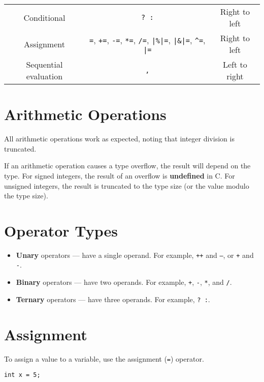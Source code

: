 \documentclass[a4paper]{report}
\begin{document}
\begin{table}[H]
\begin{tabular}{c c c}
        Conditional                   & \texttt{? :}                                                                                                                                                                                                       & Right to left                  \\ %
        Assignment                    & \texttt{=}, \texttt{+=}, \texttt{-=}, \texttt{*=}, \texttt{/=}, \texttt{|\%|=}, \texttt{|\&|=}, \texttt{^=}, \texttt{|=} & Right to left                  \\
        Sequential evaluation         & \texttt{,}                                                                                                                                                                                                         & Left to right                  \\
        \bottomrule
    \end{tabular}
\end{table}
\section{Arithmetic Operations}
All arithmetic operations work as expected, noting that integer
division is truncated.

If an arithmetic operation causes a type overflow, the result will
depend on the type. For signed integers, the result of an overflow is
\textbf{undefined} in C. For unsigned integers, the result is truncated
to the type size (or the value modulo the type size).
\section{Operator Types}
\begin{itemize}
    \item \textbf{Unary} operators --- have a single operand. For example, \texttt{++} and \texttt{--}, or \texttt{+} and \texttt{-}.
    \item \textbf{Binary} operators --- have two operands. For example, \texttt{+}, \texttt{-}, \texttt{*}, and \texttt{/}.
    \item \textbf{Ternary} operators --- have three operands. For example, \texttt{? :}. %
\end{itemize}
\section{Assignment}
To assign a value to a variable, use the assignment (\texttt{=})
operator.
\begin{verbatim}
int x = 5;
\end{verbatim}
\end{document}
